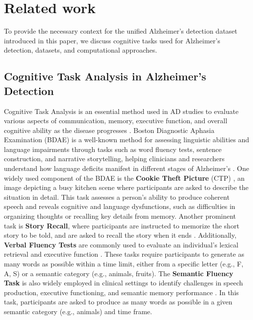 \section{Related work}
\label{sec:related}

To provide the necessary context for the unified Alzheimer's detection dataset introduced in this paper, we discuss cognitive tasks used for Alzheimer's detection, datasets, and computational approaches.

\subsection{Cognitive Task Analysis in Alzheimer's Detection}
    
Cognitive Task Analysis is an essential method used in AD studies to evaluate various aspects of communication, memory, executive function, and overall cognitive ability as the disease progresses \cite{Guarino2019Aging}. Boston Diagnostic Aphasia Examination (BDAE) is a well-known method for assessing linguistic abilities and language impairments through tasks such as word fluency tests, sentence construction, and narrative storytelling, helping clinicians and researchers understand how language deficits manifest in different stages of Alzheimer's \cite{Goodglass:1972:Book}. One widely used component of the BDAE is the \textbf{Cookie Theft Picture} (CTP) \cite{Cummings2019Describing}, an image depicting a busy kitchen scene where participants are asked to describe the situation in detail. This task assesses a person's ability to produce coherent speech and reveals cognitive and language dysfunctions, such as difficulties in organizing thoughts or recalling key details from memory.
Another prominent task is \textbf{Story Recall}, where participants are instructed to memorize the short story to be told, and are asked to recall the story when it ends \cite{Wechsler:2009:Book}. Additionally, \textbf{Verbal Fluency Tests} are commonly used to evaluate an individual’s lexical retrieval and executive function \cite{lezak2004neuropsychological}. These tasks require participants to generate as many words as possible within a time limit, either from a specific letter (e.g., F, A, S) or a semantic category (e.g., animals, fruits). The \textbf{Semantic Fluency Task} is also widely employed in clinical settings to identify challenges in speech production, executive functioning, and semantic memory performance \cite{lezak2004neuropsychological}. In this task, participants are asked to produce as many words as possible in a given semantic category (e.g., animals) and time frame. 


